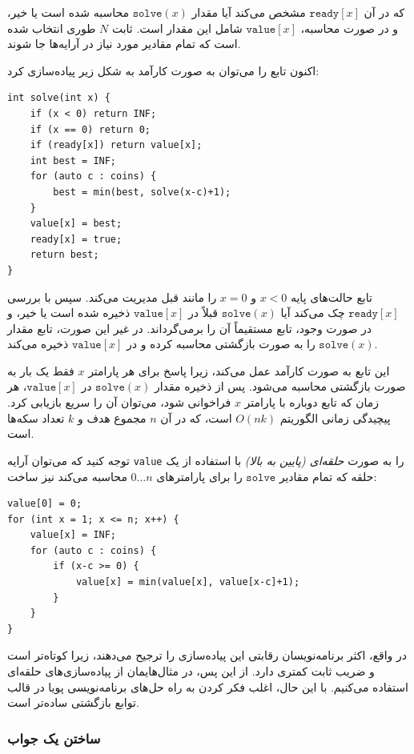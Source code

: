 که در آن $\texttt{ready}[x]$ مشخص می‌کند
آیا مقدار $\texttt{solve}(x)$ محاسبه شده است یا خیر،
و در صورت محاسبه، $\texttt{value}[x]$
شامل این مقدار است.
ثابت $N$ طوری انتخاب شده است
که تمام مقادیر مورد نیاز در آرایه‌ها جا شوند.

اکنون تابع را می‌توان به صورت کارآمد
به شکل زیر پیاده‌سازی کرد:

\begin{lstlisting}
int solve(int x) {
    if (x < 0) return INF;
    if (x == 0) return 0;
    if (ready[x]) return value[x];
    int best = INF;
    for (auto c : coins) {
        best = min(best, solve(x-c)+1);
    }
    value[x] = best;
    ready[x] = true;
    return best;
}
\end{lstlisting}

تابع حالت‌های پایه
$x<0$ و $x=0$ را مانند قبل مدیریت می‌کند.
سپس با بررسی $\texttt{ready}[x]$ چک می‌کند آیا
$\texttt{solve}(x)$ قبلاً در
$\texttt{value}[x]$ ذخیره شده است یا خیر،
و در صورت وجود، تابع مستقیماً آن را برمی‌گرداند.
در غیر این صورت، تابع مقدار $\texttt{solve}(x)$ را
به صورت بازگشتی محاسبه کرده و در $\texttt{value}[x]$ ذخیره می‌کند.

این تابع به صورت کارآمد عمل می‌کند،
زیرا پاسخ برای هر پارامتر $x$
فقط یک بار به صورت بازگشتی محاسبه می‌شود.
پس از ذخیره مقدار $\texttt{solve}(x)$ در $\texttt{value}[x]$،
هر زمان که تابع دوباره با پارامتر $x$ فراخوانی شود،
می‌توان آن را سریع بازیابی کرد.
پیچیدگی زمانی الگوریتم $O(nk)$ است،
که در آن $n$ مجموع هدف و $k$ تعداد سکه‌ها است.

توجه کنید که می‌توان آرایه \texttt{value} را به صورت \emph{حلقه‌ای (پایین به بالا)}
با استفاده از یک حلقه که تمام مقادیر $\texttt{solve}$ را
برای پارامترهای $0 \ldots n$ محاسبه می‌کند نیز ساخت:
\begin{lstlisting}
value[0] = 0;
for (int x = 1; x <= n; x++) {
    value[x] = INF;
    for (auto c : coins) {
        if (x-c >= 0) {
            value[x] = min(value[x], value[x-c]+1);
        }
    }
}
\end{lstlisting}

در واقع، اکثر برنامه‌نویسان رقابتی این
پیاده‌سازی را ترجیح می‌دهند، زیرا کوتاه‌تر است و
ضریب ثابت کمتری دارد.
از این پس، در مثال‌هایمان از پیاده‌سازی‌های حلقه‌ای
استفاده می‌کنیم.
با این حال، اغلب فکر کردن به راه حل‌های برنامه‌نویسی پویا
در قالب توابع بازگشتی ساده‌تر است.


\subsubsection{ساختن یک جواب}

